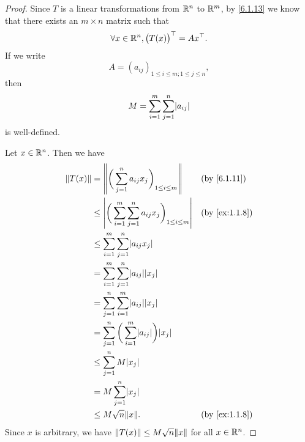 \begin{proof}
  Since \(T\) is a linear transformations from \(\mathbb{R}^n\) to \(\mathbb{R}^m\), by \cref{6.1.13} we know that there exists an \(m \times n\) matrix such that
  \[
    \forall x \in \mathbb{R}^n, \big(T(x)\big)^\top = Ax^\top.
  \]
  If we write
  \[
    A = (a_{ij})_{1 \leq i \leq m ; 1 \leq j \leq n},
  \]
  then
  \[
    M = \sum_{i = 1}^m \sum_{j = 1}^n \abs{a_{ij}}
  \]
  is well-defined.

  Let \(x \in \mathbb{R}^n\).
  Then we have
  \begin{align*}
    \norm*{T(x)} & = \norm*{\bigg(\sum_{j = 1}^n a_{ij} x_j\bigg)_{1 \leq i \leq m}}                 &  & \text{(by \cref{6.1.11})}   \\
                 & \leq \abs{\bigg(\sum_{i = 1}^m \sum_{j = 1}^n a_{ij} x_j\bigg)_{1 \leq i \leq m}} &  & \text{(by \cref{ex:1.1.8})} \\
                 & \leq \sum_{i = 1}^m \sum_{j = 1}^n \abs{a_{ij} x_j}                                                                \\
                 & = \sum_{i = 1}^m \sum_{j = 1}^n \abs{a_{ij}} \abs{x_j}                                                             \\
                 & = \sum_{j = 1}^n \sum_{i = 1}^m \abs{a_{ij}} \abs{x_j}                                                             \\
                 & = \sum_{j = 1}^n \bigg(\sum_{i = 1}^m \abs{a_{ij}}\bigg) \abs{x_j}                                                 \\
                 & \leq \sum_{j = 1}^n M \abs{x_j}                                                                                    \\
                 & = M \sum_{j = 1}^n \abs{x_j}                                                                                       \\
                 & \leq M \sqrt{n} \norm*{x}.                                                        &  & \text{(by \cref{ex:1.1.8})}
  \end{align*}
  Since \(x\) is arbitrary, we have \(\norm*{T(x)} \leq M \sqrt{n} \norm*{x}\) for all \(x \in \mathbb{R}^n\).


\end{proof}
